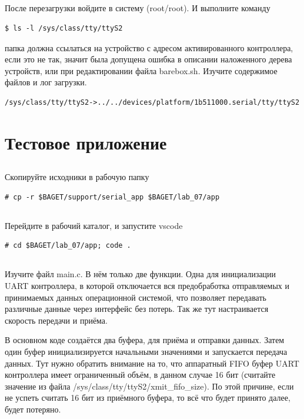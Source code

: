 \subsection{} После перезагрузки войдите в систему (root/root). И выполните команду
\begin{lstlisting}[style=bash]
$ ls -l /sys/class/tty/ttyS2
\end{lstlisting}
папка должна ссылаться на устройство с адресом активированного контроллера, если это не так, значит была допущена ошибка в описании наложенного дерева устройств, или при редактировании файла barebox.sh. Изучите содержимое файлов и лог загрузки.
\begin{lstlisting}[style=stdout]
/sys/class/tty/ttyS2->../../devices/platform/1b511000.serial/tty/ttyS2
\end{lstlisting}

\section{Тестовое приложение}

\subsection{} Скопируйте исходники в рабочую папку
\begin{lstlisting}[style=bash]
# cp -r $BAGET/support/serial_app $BAGET/lab_07/app
\end{lstlisting}

\subsection{} Перейдите в рабочий каталог, и запустите vscode
\begin{lstlisting}[style=bash]
# cd $BAGET/lab_07/app; code .
\end{lstlisting}

\subsection{} Изучите файл main.c. В нём только две функции. Одна для инициализации UART контроллера, в которой отключается вся предобработка отправляемых и принимаемых данных операционной системой, что позволяет передавать различные данные через интерфейс без потерь. Так же тут настраивается скорость передачи и приёма. 

В основном коде создаётся два буфера, для приёма и отправки данных. Затем один буфер инициализируется начальными значениями и запускается передача данных. Тут нужно обратить внимание на то, что аппаратный FIFO буфер UART контроллера имеет ограниченный объём, в данном случае 16 бит (считайте значение из файла /sys/class/tty/ttyS2/xmit\_fifo\_size). По этой причине, если не успеть считать 16 бит из приёмного буфера, то всё что будет принято далее, будет потеряно.

